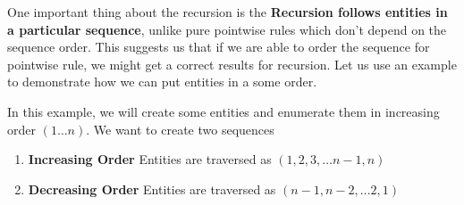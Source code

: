 
%

One important thing about the recursion is the {\bf Recursion follows entities in a particular
sequence}, unlike pure pointwise rules which don't depend on the sequence order. This suggests 
us that if we are able to order the sequence for pointwise rule, we might get a correct results 
for recursion. Let us use an example to demonstrate how we can put entities in a some order. 

\par In this example, we will create some entities and enumerate them in increasing order
$(1 \dots n)$. We want to create two sequences
\begin{enumerate}
\item  {\bf Increasing Order }  Entities are traversed as $(1,2,3, \dots n-1,n)$
\item  {\bf Decreasing Order }  Entities are traversed as $(n-1,n-2,  \dots 2,1)$
\end{enumerate}

